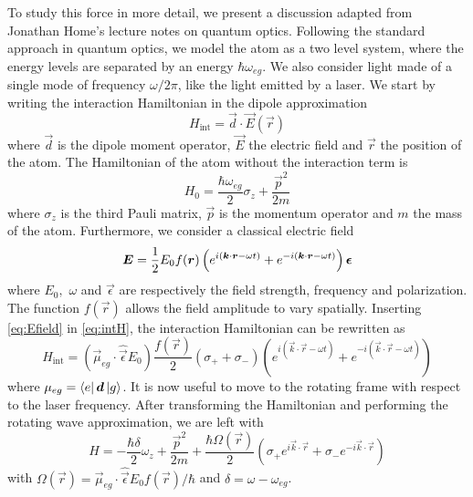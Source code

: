 To study this force in more detail, we present a discussion adapted from Jonathan Home's lecture notes on quantum optics. Following the standard approach in quantum optics, we model the atom as a two level system, where the energy levels are separated by an energy $\hbar \omega_{eg}$. We also consider light made of a single mode of frequency $\omega / 2\pi$, like the light emitted by a laser. We start by writing the interaction Hamiltonian in the dipole approximation
\begin{equation}
    \label{eq:intH}
    H_\text{int} = \vec{d} \cdot \vec{E}(\vec{r})
\end{equation}
where $\vec{d}$ is the dipole moment operator, $\vec{E}$ the electric field and $\vec{r}$ the position of the atom. The Hamiltonian of the atom without the interaction term is
\begin{equation}
    H_0 = \frac{\hbar \omega_{eg}}{2} \sigma_z + \frac{\vec
        {p}^2}{2m}
\end{equation}
where $\sigma_z$ is the third Pauli matrix, $\vec{p}$ is the momentum operator and $m$ the mass of the atom.
Furthermore, we consider a classical electric field
\begin{equation}
    \label{eq:Efield}
    \mathbf{\boldsymbol{E}} = \frac{1}{2} E_0 f(\mathbf{\boldsymbol{r}} ) \left(e^{i( \mathbf{\boldsymbol{k}}\cdot\mathbf{\boldsymbol{r}} - \omega t)} + e^{-i( \mathbf{\boldsymbol{k}}\cdot\mathbf{\boldsymbol{r}} - \omega t)}  \right) \mathbf{\boldsymbol{\epsilon}}
\end{equation}
where $E_0,$ $\omega$ and $\vec{\epsilon}$ are respectively the field strength, frequency and polarization. The function $f(\vec{r})$ allows the field amplitude to vary spatially. Inserting \cref{eq:Efield} in \cref{eq:intH}, the interaction Hamiltonian can be rewritten as
\begin{equation}
    H_\text{int} = (\vec{\mu}_{eg} \cdot \hat{\vec{\epsilon}} E_0) \frac{f(\vec{r})}{2} (\sigma_+ + \sigma_{-}) \left(e^{i( \vec{k}\cdot\vec{r} - \omega t)} + e^{-i( \vec{k}\cdot\vec{r} - \omega t)}  \right)
\end{equation}
where $\mu_{eg} = \bra{e} \mathbf{\boldsymbol{d}} \ket{g}$. It is now useful to move to the rotating frame with respect to the laser frequency. After transforming the Hamiltonian and performing the rotating wave approximation, we are left with
\begin{equation}
    H = -\frac{\hbar \delta}{2} \omega_z + \frac{\vec{p}^2}{2m} + \frac{\hbar \Omega(\vec
        r)}{2} \left( \sigma_+ e^{i\vec{k}\cdot \vec{r}} +  \sigma_{-} e^{-i\vec{k}\cdot \vec{r} } \right)
\end{equation}
with $\Omega(\vec{r}) = \vec{\mu}_{eg} \cdot \hat{\vec{\epsilon}} E_0 f(\vec{r}) / \hbar$ and $\delta = \omega - \omega_{eg}$.
